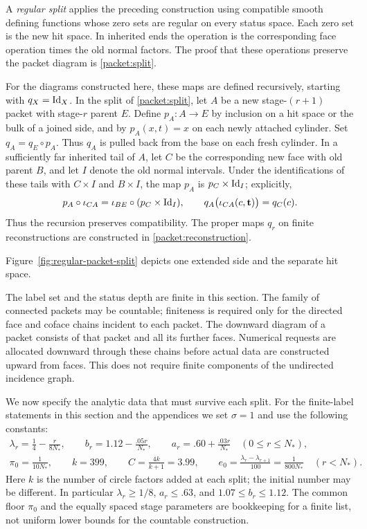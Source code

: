 A \emph{regular split} applies the preceding construction using
compatible smooth defining functions whose zero sets are regular on
every status space. Each zero set is the new hit space.
In inherited ends the operation is the corresponding face operation
times the old normal factors. The proof that these operations preserve
the packet diagram is \cref{packet:split}.

For the diagrams constructed here, these maps are defined recursively,
starting with $q_X=\operatorname{Id}_X$.  In the split of \cref{packet:split}, let
$A$ be a new stage-$(r+1)$ packet with stage-$r$ parent $E$.
Define $p_A:A\to E$ by inclusion on a hit space or the bulk of a joined
side, and by $p_A(x,t)=x$ on each newly attached cylinder.
Set $q_A=q_E\circ p_A$.  Thus $q_A$ is pulled back from the base on
each fresh cylinder.  In a sufficiently far inherited tail of $A$,
let $C$ be the corresponding new face with old parent $B$, and let
$I$ denote the old normal intervals.  Under the identifications of
these tails with $C\times I$ and $B\times I$, the map $p_A$ is
$p_C\times\operatorname{Id}_I$; explicitly,
\[
 p_A\circ\iota_{CA}=\iota_{BE}\circ(p_C\times\operatorname{Id}_I),\qquad
 q_A\bigl(\iota_{CA}(c,\mathbf t)\bigr)=q_C(c).
\]
Thus the recursion preserves compatibility.  The proper maps $q_r$
on finite reconstructions are constructed in
\cref{packet:reconstruction}.

Figure~\ref{fig:regular-packet-split} depicts one extended side and the
separate hit space.


The label set and the status depth are finite in this section. The family
of connected packets may be countable; finiteness is required only for
the directed face and coface chains incident to each packet. The
downward diagram of a packet consists of that packet and all its further
faces. Numerical
requests are allocated downward through these chains before actual data
are constructed upward from faces. This does not require finite
components of the undirected incidence graph.

We now specify the analytic data that must survive each split.
For the finite-label statements in this section and the appendices we set $\sigma=1$
and use the following constants:
\begin{equation}\label{packet:constants}
\begin{gathered}
 \lambda_r=\frac14-\frac{r}{8N_*},\qquad
 b_r=1.12-\frac{.05r}{N_*},\qquad
 a_r=.60+\frac{.03r}{N_*}\quad(0\le r\le N_*),\\
 \pi_0=\frac{1}{10N_*},\qquad k=399,\qquad
 C=\frac{4k}{k+1}=3.99,\qquad
 e_0=\frac{\lambda_r-\lambda_{r+1}}{100}
     =\frac{1}{800N_*}\quad(r<N_*).
\end{gathered}
\end{equation}
Here $k$ is the number of circle factors added at each split; the initial
number may be different.  In particular $\lambda_r\ge1/8$, $a_r\le.63$,
and $1.07\le b_r\le1.12$.  The common floor $\pi_0$ and the equally
spaced stage parameters are bookkeeping for a finite list, not uniform
lower bounds for the countable construction.

